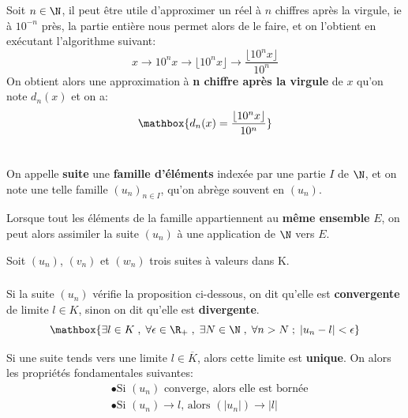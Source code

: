 \subsection*{}
Soit \(n \in \N\), il peut être utile d'approximer un réel à \(n\) chiffres après la virgule, ie à \(10^{-n}\) près, la partie entière nous permet alors de le faire, et on l'obtient en exécutant l'algorithme suivant:
\[
    x \rightarrow 10^n x \rightarrow \lfloor 10^n x \rfloor \rightarrow \frac{\lfloor 10^n x \rfloor}{10^n}
\]
On obtient alors une approximation à \textbf{n chiffre après la virgule} de \(x\) qu'on note \(d_n(x)\) et on a:
\[
    \mathbox{
        d_n(x) = \frac{\lfloor 10^n x \rfloor}{10^n}
    }
\]

\chapter*{}
On appelle \textbf{suite} une \textbf{famille d'éléments} indexée par une partie \(I\) de \(\N\), et on note une telle famille \((u_n)_{n \in I}\), qu'on abrège souvent en \((u_n)\).\<

Lorsque tout les éléments de la famille appartiennent au \textbf{même ensemble} \(E\), on peut alors assimiler la suite \((u_n)\) à une application de \(\N\) vers \(E\).\<

Soit \((u_n)\), \((v_n)\) et \((w_n)\) trois suites à valeurs dans K.

\subsection*{}
Si la suite \((u_n)\) vérifie la proposition ci-dessous, on dit qu'elle est \textbf{convergente} de limite \(l \in K\), sinon on dit qu'elle est \textbf{divergente}.
\[
    \mathbox{
        \exists l \in K \; , \; \forall \epsilon \in \R_+ \; , \; \exists N \in \N \; , \; \forall n > N \; ; \; |u_n - l| < \epsilon   
    }
\]

Si une suite tends vers une limite \(l \in \overline{K}\), alors cette limite est \textbf{unique}.\+
On alors les propriétés fondamentales suivantes:
\begin{align*}
    &\bullet \text{Si \((u_n)\) converge, alors elle est bornée}\\
    &\bullet \text{Si \((u_n) \rightarrow l\), alors \((|u_n|) \rightarrow |l|\)}
\end{align*}

